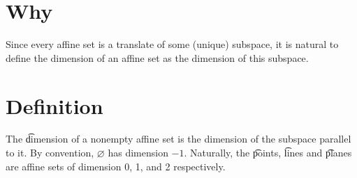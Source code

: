 
\section*{Why}

Since every affine set is a translate of some (unique) subspace, it is natural to define the dimension of an affine set as the dimension of this subspace.

\section*{Definition}

The \t{dimension} of a nonempty affine set is the dimension of the subspace parallel to it.
By convention, $\varnothing$ has dimension $-1$.
Naturally, the \t{points}, \t{lines} and \t{planes} are affine sets of dimension 0, 1, and 2 respectively.

\blankpage